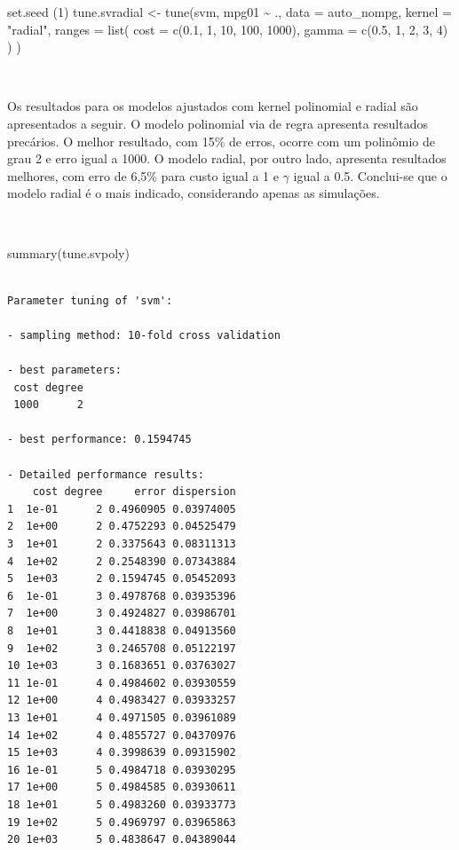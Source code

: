 \documentclass[
  a4paperpaper,
]{article}
\newenvironment{Shaded}{\begin{snugshade}}{\end{snugshade}}
\newcommand{\AttributeTok}[1]{\textcolor[rgb]{0.40,0.45,0.13}{#1}}
\newcommand{\DecValTok}[1]{\textcolor[rgb]{0.68,0.00,0.00}{#1}}
\newcommand{\FloatTok}[1]{\textcolor[rgb]{0.68,0.00,0.00}{#1}}
\newcommand{\FunctionTok}[1]{\textcolor[rgb]{0.28,0.35,0.67}{#1}}
\newcommand{\NormalTok}[1]{\textcolor[rgb]{0.00,0.23,0.31}{#1}}
\newcommand{\OtherTok}[1]{\textcolor[rgb]{0.00,0.23,0.31}{#1}}
\newcommand{\SpecialCharTok}[1]{\textcolor[rgb]{0.37,0.37,0.37}{#1}}
\newcommand{\StringTok}[1]{\textcolor[rgb]{0.13,0.47,0.30}{#1}}
\begin{document}
\begin{Shaded}
\begin{Highlighting}[]
\FunctionTok{set.seed}\NormalTok{ (}\DecValTok{1}\NormalTok{)}
\NormalTok{tune.svradial }\OtherTok{\textless{}{-}} \FunctionTok{tune}\NormalTok{(svm, mpg01 }\SpecialCharTok{\textasciitilde{}}\NormalTok{ ., }\AttributeTok{data =}\NormalTok{ auto\_nompg,}
                   \AttributeTok{kernel =} \StringTok{"radial"}\NormalTok{,}
                   \AttributeTok{ranges =} \FunctionTok{list}\NormalTok{(}
                     \AttributeTok{cost =} \FunctionTok{c}\NormalTok{(}\FloatTok{0.1}\NormalTok{, }\DecValTok{1}\NormalTok{, }\DecValTok{10}\NormalTok{, }\DecValTok{100}\NormalTok{, }\DecValTok{1000}\NormalTok{),}
                     \AttributeTok{gamma =} \FunctionTok{c}\NormalTok{(}\FloatTok{0.5}\NormalTok{, }\DecValTok{1}\NormalTok{, }\DecValTok{2}\NormalTok{, }\DecValTok{3}\NormalTok{, }\DecValTok{4}\NormalTok{)}
\NormalTok{                   )}
\NormalTok{)}
\end{Highlighting}
\end{Shaded}

~

Os resultados para os modelos ajustados com kernel polinomial e radial
são apresentados a seguir. O modelo polinomial via de regra apresenta
resultados precários. O melhor resultado, com 15\% de erros, ocorre com
um polinômio de grau 2 e erro igual a 1000. O modelo radial, por outro
lado, apresenta resultados melhores, com erro de 6,5\% para custo igual
a 1 e \(\gamma\) igual a 0.5. Conclui-se que o modelo radial é o mais
indicado, considerando apenas as simulações.

~

\begin{Shaded}
\begin{Highlighting}[]
\FunctionTok{summary}\NormalTok{(tune.svpoly)}
\end{Highlighting}
\end{Shaded}

\begin{verbatim}

Parameter tuning of 'svm':

- sampling method: 10-fold cross validation 

- best parameters:
 cost degree
 1000      2

- best performance: 0.1594745 

- Detailed performance results:
    cost degree     error dispersion
1  1e-01      2 0.4960905 0.03974005
2  1e+00      2 0.4752293 0.04525479
3  1e+01      2 0.3375643 0.08311313
4  1e+02      2 0.2548390 0.07343884
5  1e+03      2 0.1594745 0.05452093
6  1e-01      3 0.4978768 0.03935396
7  1e+00      3 0.4924827 0.03986701
8  1e+01      3 0.4418838 0.04913560
9  1e+02      3 0.2465708 0.05122197
10 1e+03      3 0.1683651 0.03763027
11 1e-01      4 0.4984602 0.03930559
12 1e+00      4 0.4983427 0.03933257
13 1e+01      4 0.4971505 0.03961089
14 1e+02      4 0.4855727 0.04370976
15 1e+03      4 0.3998639 0.09315902
16 1e-01      5 0.4984718 0.03930295
17 1e+00      5 0.4984585 0.03930611
18 1e+01      5 0.4983260 0.03933773
19 1e+02      5 0.4969797 0.03965863
20 1e+03      5 0.4838647 0.04389044
\end{verbatim}
\end{document}

